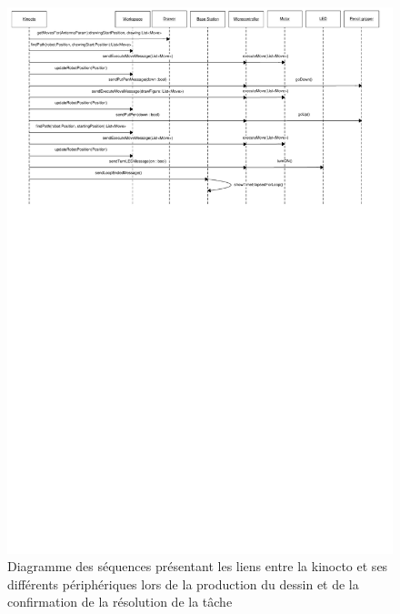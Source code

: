 \begin{figure}[htb]
\includegraphics[scale=0.9]{fig/diagrammes_sequence4.pdf}
\caption{Diagramme des séquences présentant les liens entre la kinocto et ses différents périphériques lors de la production du dessin et de la confirmation de la résolution de la tâche}
\label{diagSeq4Ite1}
\end{figure}
